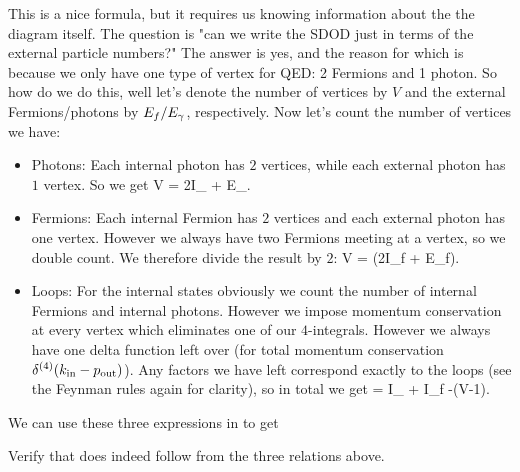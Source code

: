 This is a nice formula, but it requires us knowing information about the the diagram itself. The question is "can we write the SDOD just in terms of the external particle numbers?" The answer is yes, and the reason for which is because we only have one type of vertex for QED: 2 Fermions and 1 photon. So how do we do this, well let's denote the number of vertices by $V$ and the external Fermions/photons by $E_f/E_{\gamma}$, respectively. Now let's count the number of vertices we have:
\begin{itemize}
    \item Photons: Each internal photon has $2$ vertices, while each external photon has $1$ vertex. So we get 
    \bse 
        V = 2I_{\g} + E_{\g}.
    \ese
    \item Fermions: Each internal Fermion has $2$ vertices and each external photon has one vertex. However we always have two Fermions meeting at a vertex, so we double count. We therefore divide the result by $2$:
    \bse 
        V = (2I_f + E_f).
    \ese 
    \item Loops: For the internal states obviously we count the number of internal Fermions and internal photons. However we impose momentum conservation at every vertex which eliminates one of our $4$-integrals. However we always have one delta function left over (for total momentum conservation $\delta^{(4)}(k_{\text{in}} - p_{\text{out}})$). Any factors we have left correspond exactly to the loops (see the Feynman rules again for clarity), so in total we get 
    \bse 
        \ell = I_{\g} + I_f -(V-1).
    \ese 
\end{itemize}

We can use these three expressions in  to get 

\bbox 
    Verify that  does indeed follow from the three relations above.
\ebox 

